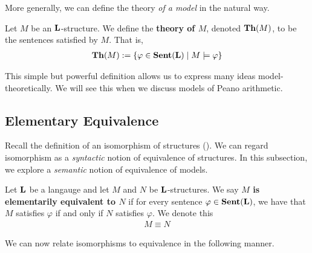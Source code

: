 More generally, we can define the theory \textit{of a model} in the natural way.

\begin{boxdefinition}\label{Ch1:Def:Thy_of_Model}
    Let $M$ be an $\mathbf{L}$-structure. We define the \textbf{theory of $M$}, denoted $\mathbf{Th}(M)$, to be the sentences satisfied by $M$. That is,
    \begin{align*}
        \mathbf{Th}(M) := \left\{ \varphi \in \mathbf{Sent}\!\left( \mathbf{L} \right) \; \middle\vert \; M \models \varphi \right\}
    \end{align*}
\end{boxdefinition}

This simple but powerful definition allows us to express many ideas model-theoretically. We will see this when we discuss models of Peano arithmetic.

\subsection{Elementary Equivalence}

Recall the definition of an isomorphism of structures (). We can regard isomorphism as a \textit{syntactic} notion of equivalence of structures. In this subsection, we explore a \textit{semantic} notion of equivalence of models.

\begin{boxdefinition}
    Let $\mathbf{L}$ be a langauge and let $M$ and $N$ be $\mathbf{L}$-structures. We say \textbf{$M$ is elementarily equivalent to $N$} if for every sentence $\varphi \in \mathbf{Sent}\!\left( \mathbf{L} \right)$, we have that $M$ satisfies $\varphi$ if and only if $N$ satisfies $\varphi$. We denote this
    \begin{align*}
        M \equiv N
    \end{align*}
\end{boxdefinition}

We can now relate isomorphisms to equivalence in the following manner.

